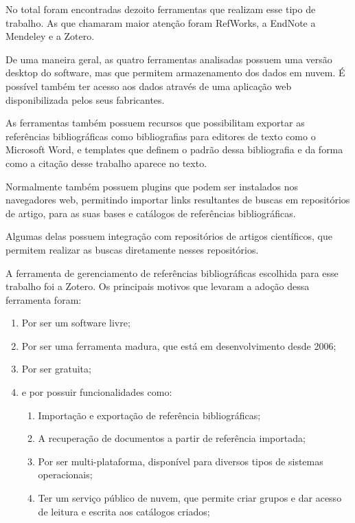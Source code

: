 No total foram encontradas dezoito ferramentas que realizam esse tipo de trabalho. As que chamaram maior atenção foram RefWorks, a EndNote a Mendeley e a Zotero. 

De uma maneira geral, as quatro ferramentas analisadas possuem uma versão desktop do software, mas que permitem armazenamento dos dados em nuvem. É possível também ter acesso aos dados através de uma aplicação web disponibilizada pelos seus fabricantes.

As ferramentas também possuem recursos que possibilitam exportar as referências bibliográficas como bibliografias para editores de texto como o Microsoft Word, e templates que definem o padrão dessa bibliografia e da forma como a citação desse trabalho aparece no texto.

Normalmente também possuem plugins que podem ser instalados nos navegadores web, permitindo importar links resultantes de buscas em repositórios de artigo, para as suas bases e catálogos de referências bibliográficas.

Algumas delas possuem integração com repositórios de artigos científicos, que permitem realizar as buscas diretamente nesses repositórios.

A ferramenta de gerenciamento de referências bibliográficas escolhida para esse trabalho foi a Zotero. Os principais motivos que levaram a adoção dessa ferramenta foram: 

\begin{enumerate}
    \item Por ser um software livre;
    \item Por ser uma ferramenta madura, que está em desenvolvimento desde 2006;
    \item Por ser gratuita;
    \item e por possuir funcionalidades como:
        \begin{enumerate}
            \item Importação e exportação de referência bibliográficas;
            \item A recuperação de documentos a partir de referência importada; 
            \item Por ser multi-plataforma, disponível para diversos tipos de sistemas operacionais;
            \item Ter um serviço público de nuvem, que permite criar grupos e dar acesso de leitura e escrita aos catálogos criados;
        \end{enumerate}
\end{enumerate}

